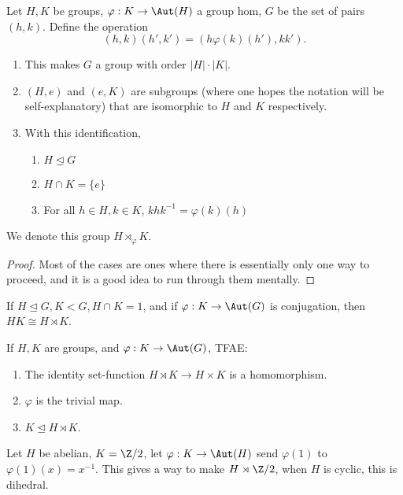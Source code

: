 \documentclass{article}
\begin{document}
\begin{thm}
 Let $H,K$ be groups, $\varphi:K\to\Aut(H)$ a group hom, $G$ be the set of pairs
 $(h,k)$. Define the operation
 $$(h,k)(h',k') = (h\varphi(k)(h'), kk').$$
 \begin{enumerate}
 \item This makes $G$ a group with order $|H|\cdot|K|$.
 \item $(H,e)$ and $(e,K)$ are subgroups (where one hopes the notation
   will be self-explanatory) that are isomorphic to $H$ and $K$ respectively.
 \item With this identification,
   \begin{enumerate}
   \item $H\trianglelefteq G$
   \item $H\cap K = \{e\}$
   \item For all $h\in H, k\in K$, $khk^{-1}=\varphi(k)(h)$
   \end{enumerate}
 \end{enumerate}
 We denote this group $H\rtimes_\varphi K$.
\end{thm}

\begin{proof}
  Most of the cases are ones where there is essentially only one way to proceed,
  and it is a good idea to run through them mentally. 
\end{proof}

\begin{thm}
  If $H\trianglelefteq G, K<G, H\cap K=1$, and if $\varphi:K\to\Aut(G)$ is
  conjugation, then $HK\cong H\rtimes K$.
\end{thm}

\begin{prop}
  If $H,K$ are groups, and $\varphi:K\to\Aut(G)$, TFAE:
  \begin{enumerate}
  \item The identity set-function $H\rtimes K\to H\times K$ is a homomorphism.
   
  \item $\varphi$ is the trivial map.

  \item $K\trianglelefteq H\rtimes K$.
  \end{enumerate}
\end{prop}

Let $H$ be abelian, $K=\Z/2$, let $\varphi:K\to\Aut(H)$ send $\varphi(1)$ to
$\varphi(1)(x) = x^{-1}$. This gives a way to make $H\rtimes \Z/2$, when $H$ is
cyclic, this is dihedral.
\end{document}
